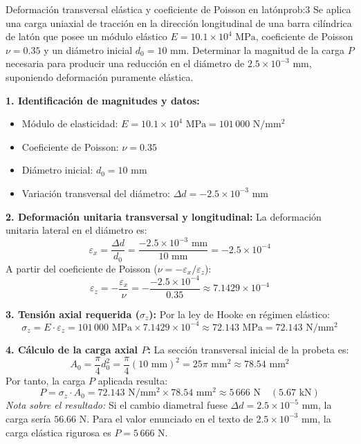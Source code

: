 \vspace{1em}

\begin{question}{Deformación transversal elástica y coeficiente de Poisson en latón}{prob:3}
    Se aplica una carga uniaxial de tracción en la dirección longitudinal de una barra cilíndrica de latón que posee un módulo elástico $E = 10.1 \times 10^4\text{ MPa}$, coeficiente de Poisson $\nu = 0.35$ y un diámetro inicial $d_0 = 10\text{ mm}$. Determinar la magnitud de la carga $P$ necesaria para producir una reducción en el diámetro de $2.5 \times 10^{-3}\text{ mm}$, suponiendo deformación puramente elástica.
\end{question}

\solve{}
\textbf{1. Identificación de magnitudes y datos:}
\begin{itemize}
    \item Módulo de elasticidad: $E = 10.1 \times 10^4\text{ MPa} = 101\,000\text{ N}/\text{mm}^2$
    \item Coeficiente de Poisson: $\nu = 0.35$
    \item Diámetro inicial: $d_0 = 10\text{ mm}$
    \item Variación transversal del diámetro: $\Delta d = -2.5 \times 10^{-3}\text{ mm}$
\end{itemize}

\textbf{2. Deformación unitaria transversal y longitudinal:}
La deformación unitaria lateral en el diámetro es:
\begin{equation*}
    \varepsilon_x = \frac{\Delta d}{d_0} = \frac{-2.5 \times 10^{-3}\text{ mm}}{10\text{ mm}} = -2.5 \times 10^{-4}
\end{equation*}
A partir del coeficiente de Poisson ($\nu = -\varepsilon_x / \varepsilon_z$):
\begin{equation*}
    \varepsilon_z = -\frac{\varepsilon_x}{\nu} = -\frac{-2.5 \times 10^{-4}}{0.35} \approx 7.1429 \times 10^{-4}
\end{equation*}

\textbf{3. Tensión axial requerida ($\sigma_z$):}
Por la ley de Hooke en régimen elástico:
\begin{equation*}
    \sigma_z = E \cdot \varepsilon_z = 101\,000\text{ MPa} \times 7.1429 \times 10^{-4} \approx 72.143\text{ MPa} = 72.143\text{ N}/\text{mm}^2
\end{equation*}

\textbf{4. Cálculo de la carga axial $P$:}
La sección transversal inicial de la probeta es:
\begin{equation*}
    A_0 = \frac{\pi}{4} d_0^2 = \frac{\pi}{4} (10\text{ mm})^2 = 25\pi\text{ mm}^2 \approx 78.54\text{ mm}^2
\end{equation*}
Por tanto, la carga $P$ aplicada resulta:
\begin{equation*}
    P = \sigma_z \cdot A_0 = 72.143\text{ N}/\text{mm}^2 \times 78.54\text{ mm}^2 \approx 5\,666\text{ N} \quad (5.67\text{ kN})
\end{equation*}
\textit{Nota sobre el resultado:} Si el cambio diametral fuese $\Delta d = 2.5 \times 10^{-5}\text{ mm}$, la carga sería $56.66\text{ N}$. Para el valor enunciado en el texto de $2.5 \times 10^{-3}\text{ mm}$, la carga elástica rigurosa es $P = 5\,666\text{ N}$.


